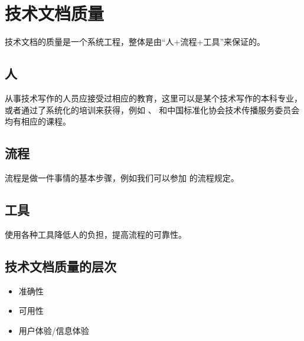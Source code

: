 \documentclass[letterpaper,10pt,english]{sphinxmanual}
\begin{document}
\sphinxstepscope


\chapter{技术文档质量}
\label{\detokenize{doc-quality/doc-quality-intro:id1}}\label{\detokenize{doc-quality/doc-quality-intro::doc}}
\sphinxAtStartPar
技术文档的质量是一个系统工程，整体是由“人+流程+工具”来保证的。


\section{人}
\label{\detokenize{doc-quality/doc-quality-intro:id2}}
\sphinxAtStartPar
从事技术写作的人员应接受过相应的教育，这里可以是某个技术写作的本科专业，或者通过了系统化的培训来获得，例如 、 和中国标准化协会技术传播服务委员会均有相应的课程。


\section{流程}
\label{\detokenize{doc-quality/doc-quality-intro:id3}}
\sphinxAtStartPar
流程是做一件事情的基本步骤，例如我们可以参加  的流程规定。


\section{工具}
\label{\detokenize{doc-quality/doc-quality-intro:id4}}
\sphinxAtStartPar
使用各种工具降低人的负担，提高流程的可靠性。


\section{技术文档质量的层次}
\label{\detokenize{doc-quality/doc-quality-intro:id5}}\begin{itemize}
\item {} 
\sphinxAtStartPar
准确性

\item {} 
\sphinxAtStartPar
可用性

\item {} 
\sphinxAtStartPar
用户体验/信息体验

\end{itemize}
\end{document}
